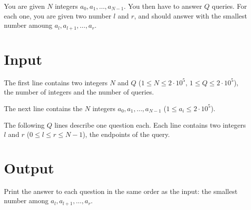 
You are given $N$ integers $a_0, a_1, \dots, a_{N-1}$. You then have to answer $Q$ queries. For each one,
you are given two number $l$ and $r$, and should answer with the smallest number amoung $a_l,a_{l+1},\dots,a_{r}$.

\section*{Input}
The first line contains two integers $N$ and $Q$ ($1 \leq N \leq 2 \cdot 10^5$, $1 \leq Q \leq 2 \cdot 10^5$),
the number of integers and the number of queries.

The next line contains the $N$ integers $a_0, a_1, \dots, a_{N-1}$ ($1 \leq a_i \leq 2 \cdot 10^5$).

The following $Q$ lines describe one question each. Each line contains two integers $l$ and $r$ ($0 \leq l \leq r \leq N-1$),
the endpoints of the query.


\section*{Output}
Print the answer to each question in the same order as the input: the smallest number among $a_l, a_{l+1},\dots,a_{r}$.
